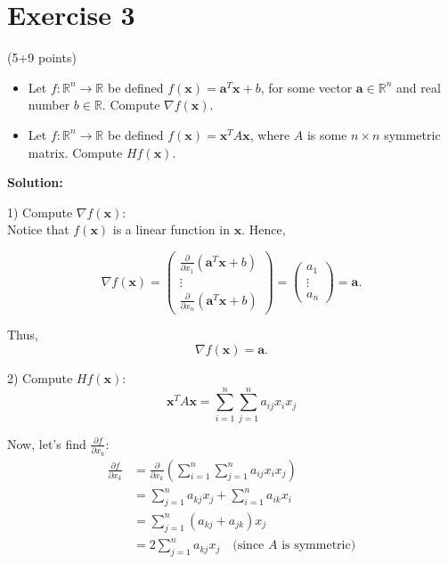 \documentclass{article}
\begin{document}
\section*{Exercise 3}
(5+9 points)
\begin{itemize}
    \item Let $f: \mathbb{R}^n \to \mathbb{R}$ be defined $f(\mathbf{x}) = \mathbf{a}^T\mathbf{x} + b$, for some vector $\mathbf{a} \in \mathbb{R}^n$ and real number $b \in \mathbb{R}$. Compute $\nabla f(\mathbf{x})$.
    \item Let $f: \mathbb{R}^n \to \mathbb{R}$ be defined $f(\mathbf{x}) = \mathbf{x}^T A\mathbf{x}$, where $A$ is some $n \times n$ symmetric matrix. Compute $Hf(\mathbf{x})$.
\end{itemize}

\textbf{Solution:}

1) Compute $\nabla f(\mathbf{x})$:\\

Notice that \(f(\mathbf{x})\) is a linear function in \(\mathbf{x}\). Hence,

\[
\nabla f(\mathbf{x}) 
= \begin{pmatrix}
\frac{\partial}{\partial x_1} (\mathbf{a}^T \mathbf{x} + b) \\
\vdots \\
\frac{\partial}{\partial x_n} (\mathbf{a}^T \mathbf{x} + b)
\end{pmatrix}
= \begin{pmatrix}
a_1 \\
\vdots \\
a_n
\end{pmatrix}
= \mathbf{a}.
\]

Thus,
\[
\nabla f(\mathbf{x}) = \mathbf{a}.
\]

2) Compute $Hf(\mathbf{x})$:\\

$$\mathbf{x}^T A\mathbf{x} = \sum_{i=1}^n\sum_{j=1}^n a_{ij}x_ix_j$$

Now, let's find $\frac{\partial f}{\partial x_k}$:
\begin{align*}
\frac{\partial f}{\partial x_k} &= \frac{\partial}{\partial x_k}(\sum_{i=1}^n\sum_{j=1}^n a_{ij}x_ix_j) \\
&= \sum_{j=1}^n a_{kj}x_j + \sum_{i=1}^n a_{ik}x_i \\
&= \sum_{j=1}^n (a_{kj} + a_{jk})x_j \\
&= 2\sum_{j=1}^n a_{kj}x_j \quad \text{(since $A$ is symmetric)}
\end{align*}
\end{document}
